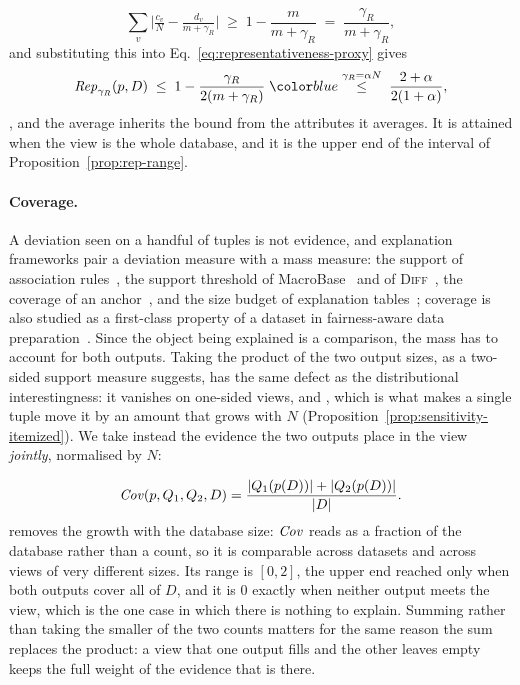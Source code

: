 \[
\sum_v\Big|\tfrac{c_v}{N}-\tfrac{d_v}{m+\gamma_R}\Big|\;\ge\;1-\frac{m}{m+\gamma_R}\;=\;\frac{\gamma_R}{m+\gamma_R},
\]
and substituting this into Eq.~\eqref{eq:representativeness-proxy} gives
\begin{equation}
\Rep_{\gamma_R}(p,D)\;\le\;1-\frac{\gamma_R}{2(m+\gamma_R)}\;\added{\overset{\gamma_R=\alpha N}{\le}\;\frac{2+\alpha}{2(1+\alpha)}},
\label{eq:rep-upper}
\end{equation}
, and the average inherits the bound from the attributes it averages.
It is attained when the view is the whole database, and it is the upper end of the interval of Proposition~\ref{prop:rep-range}.


\paragraph{Coverage.}
A deviation seen on a handful of tuples is not evidence, and explanation frameworks pair a deviation measure with a mass measure: the support of association rules~\cite{AgrawalIS93}, the support threshold of MacroBase~\cite{MacroBase} and of \textsc{Diff}~\cite{DIFF}, the coverage of an anchor~\cite{Anchors}, and the size budget of explanation tables~\cite{ExplanationTables}; coverage is also studied as a first-class property of a dataset in fairness-aware data preparation~\cite{AsudehJJ19}.
Since the object being explained is a comparison, the mass has to account for both outputs.
Taking the product of the two output sizes, as a two-sided support measure suggests, has the same defect as the distributional interestingness: it vanishes on one-sided views, and , which is what makes a single tuple move it by an amount that grows with $N$ (Proposition~\ref{prop:sensitivity-itemized}).
We take instead the evidence the two outputs place in the view \emph{jointly}, normalised by  $N$:

\begin{equation}
\mathit{Cov}(p,Q_1,Q_2,D)=\frac{|Q_1(p(D))|+|Q_2(p(D))|}{|D|}.
\label{eq:coverage-proxy}
\end{equation}
 removes the growth with the database size: $\mathit{Cov}$ reads as a fraction of the database rather than a count, so it is comparable across datasets and across views of very different sizes.
Its range is $[0,2]$, the upper end reached only when both outputs cover all of $D$, and it is $0$ exactly when neither output meets the view, which is the one case in which there is nothing to explain.
Summing rather than taking the smaller of the two counts matters for the same reason the sum replaces the product: a view that one output fills and the other leaves empty keeps the full weight of the evidence that is there.

